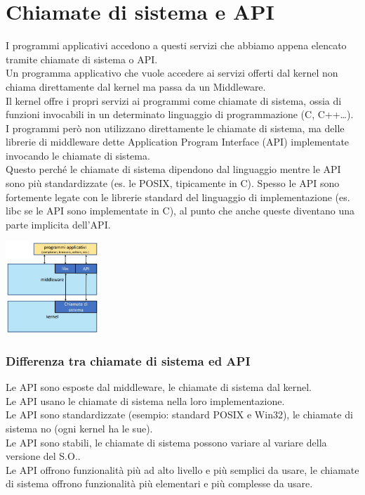 \section{Chiamate di sistema e API}
I programmi applicativi accedono a questi servizi che abbiamo appena elencato tramite chiamate di sistema o API.\\
Un programma applicativo che vuole accedere ai servizi offerti dal kernel non chiama direttamente dal kernel ma passa da un Middleware.\\
Il kernel offre i propri servizi ai programmi come chiamate di sistema, ossia di funzioni invocabili in un determinato linguaggio di programmazione (C, C++\dots).\\
I programmi però non utilizzano direttamente le chiamate di sistema, ma delle librerie di middleware dette Application Program Interface (API) implementate invocando le chiamate di sistema.\\
Questo perché le chiamate di sistema dipendono dal linguaggio mentre le API sono più standardizzate (es. le POSIX, tipicamente in C). Spesso le API sono fortemente legate con le librerie standard del linguaggio di implementazione (es. libc se le API sono implementate in C), al punto che anche queste diventano una parte implicita dell'API.
\begin{center}
    \includegraphics[width=35mm]{images/SO/SO_chiamatedisistema_API1.jpg}
\end{center}

\subsubsection{Differenza tra chiamate di sistema ed API}
Le API sono esposte dal middleware, le chiamate di sistema dal kernel.\\
Le API usano le chiamate di sistema nella loro implementazione.\\
Le API sono standardizzate (esempio: standard POSIX e Win32), le chiamate di sistema no (ogni kernel ha le sue).\\
Le API sono stabili, le chiamate di sistema possono variare al variare della versione del S.O..\\
Le API offrono funzionalità più ad alto livello e più semplici da usare, le chiamate di sistema offrono funzionalità più elementari e più complesse da usare.

